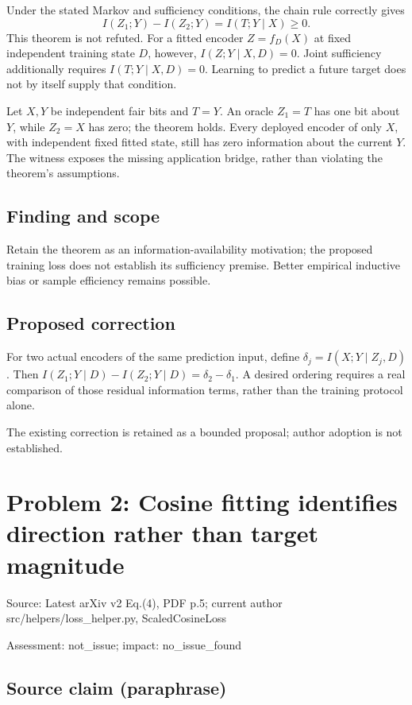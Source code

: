 \documentclass[11pt]{article}
\begin{document}
Under the stated Markov and sufficiency conditions, the chain rule correctly gives \[I(Z_1;Y)-I(Z_2;Y)=I(T;Y\mid X)\geq0.\] This theorem is not refuted. For a fitted encoder \(Z=f_D(X)\) at fixed independent training state \(D\), however, \(I(Z;Y\mid X,D)=0\). Joint sufficiency additionally requires \(I(T;Y\mid X,D)=0\). Learning to predict a future target does not by itself supply that condition.

Let \(X,Y\) be independent fair bits and \(T=Y\). An oracle \(Z_1=T\) has one bit about \(Y\), while \(Z_2=X\) has zero; the theorem holds. Every deployed encoder of only \(X\), with independent fixed fitted state, still has zero information about the current \(Y\). The witness exposes the missing application bridge, rather than violating the theorem’s assumptions.

\subsection*{Finding and scope}

Retain the theorem as an information-availability motivation; the proposed training loss does not establish its sufficiency premise. Better empirical inductive bias or sample efficiency remains possible.

\subsection*{Proposed correction}

For two actual encoders of the same prediction input, define \(\delta_j=I(X;Y\mid Z_j,D)\). Then \(I(Z_1;Y\mid D)-I(Z_2;Y\mid D)=\delta_2-\delta_1\). A desired ordering requires a real comparison of those residual information terms, rather than the training protocol alone.

The existing correction is retained as a bounded proposal; author adoption is not established.

\section*{Problem 2: Cosine fitting identifies direction rather than target magnitude}

Source: Latest arXiv v2 Eq.(4), PDF p.5; current author src/helpers/loss\_helper.py, ScaledCosineLoss

Assessment: not\_issue; impact: no\_issue\_found

\subsection*{Source claim (paraphrase)}
\end{document}
